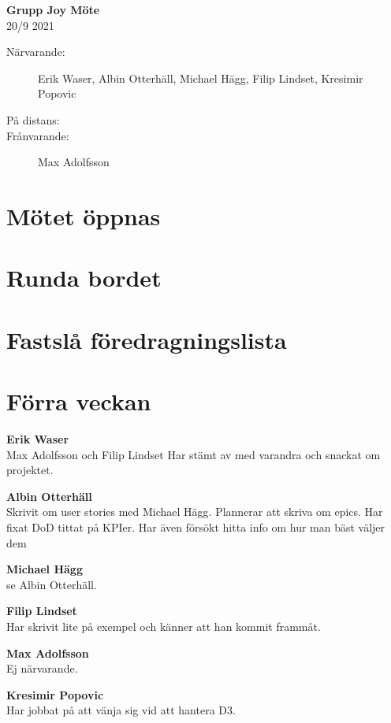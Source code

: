 \documentclass[9pt]{article}
\newcommand{\Waser}{Erik Waser\xspace}
\newcommand{\Slaget}{Albin Otterhäll\xspace}
\newcommand{\Max}{Max Adolfsson\xspace}
\newcommand{\Kim}{Michael Hägg\xspace}
\newcommand{\Algen}{Filip Lindset\xspace}
\newcommand{\Kres}{Kresimir Popovic\xspace}
\newcommand{\datum}{20/9 2021} %
\begin{document}
\begin{center}
    \Large{\textbf{Grupp Joy Möte}}\\
    \normalsize
    \datum \\ %
\end{center}

\begin{description} %
  \item [Närvarande:] \Waser, \Slaget, \Kim, \Algen, \Kres
  \item [På distans:]
  \item [Frånvarande:] \Max

\end{description}

\section{Mötet öppnas}

\section{Runda bordet}

\section{Fastslå föredragningslista}

\section{Förra veckan}
\textbf{\Waser}\\ \Max och \Algen Har stämt av med varandra och snackat om projektet. 

\textbf{\Slaget}\\ Skrivit om user stories med \Kim. Plannerar att skriva om epics. Har fixat DoD tittat på KPIer. Har även försökt hitta info om hur man bäst väljer dem

\textbf{\Kim}\\ se \Slaget.

\textbf{\Algen}\\ Har skrivit lite på exempel och känner att han kommit frammåt. 

\textbf{\Max}\\ Ej närvarande.

\textbf{\Kres}\\ Har jobbat på att vänja sig vid att hantera D3. 
\end{document}
